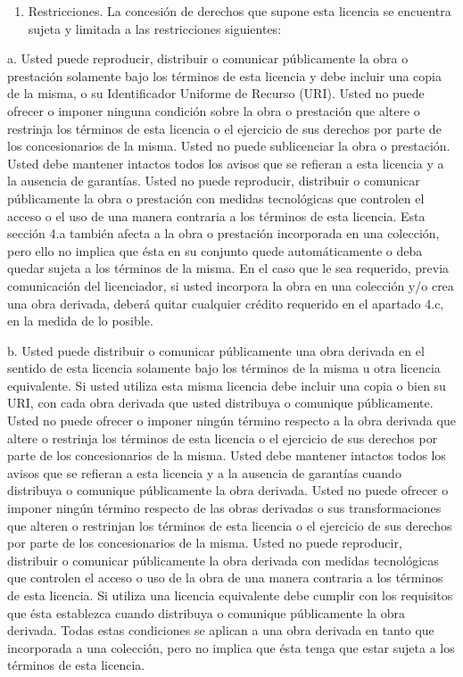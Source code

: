 \documentclass[11pt]{article}
\begin{document}
{{\begin{enumerate}
\item Restricciones. La concesión de derechos que supone esta licencia se encuentra sujeta y limitada a las restricciones siguientes:
\end{enumerate}
a. Usted puede reproducir, distribuir o comunicar públicamente la obra o prestación solamente bajo los términos de esta licencia y debe incluir una copia de la misma, o su Identificador Uniforme de Recurso (URI). Usted no puede ofrecer o imponer ninguna condición sobre la obra o prestación que altere o restrinja los términos de esta licencia o el ejercicio de sus derechos por parte de los concesionarios de la misma. Usted no puede sublicenciar la obra o prestación. Usted debe mantener intactos todos los avisos que se refieran a esta licencia y a la ausencia de garantías. Usted no puede reproducir, distribuir o comunicar públicamente la obra o prestación con medidas tecnológicas que controlen el acceso o el uso de una manera contraria a los términos de esta licencia. Esta sección 4.a también afecta a la obra o prestación incorporada en una colección, pero ello no implica que ésta en su conjunto quede automáticamente o deba quedar sujeta a los términos de la misma. En el caso que le sea requerido, previa comunicación del licenciador, si usted incorpora la obra en una colección y/o crea una obra derivada, deberá quitar cualquier crédito requerido en el apartado 4.c, en la medida de lo posible. 

b. Usted puede distribuir o comunicar públicamente una obra derivada en el sentido de esta licencia solamente bajo los términos de la misma u otra licencia equivalente. Si usted utiliza esta misma licencia debe incluir una copia o bien su URI, con cada obra derivada que usted distribuya o comunique públicamente. Usted no puede ofrecer o imponer ningún término respecto a la obra derivada que altere o restrinja los términos de esta licencia o el ejercicio de sus derechos por parte de los concesionarios de la misma. Usted debe mantener intactos todos los avisos que se refieran a esta licencia y a la ausencia de garantías cuando distribuya o comunique públicamente la obra derivada. Usted no puede ofrecer o imponer ningún término respecto de las obras derivadas o sus transformaciones que alteren o restrinjan los términos de esta licencia o el ejercicio de sus derechos por parte de los concesionarios de la misma. Usted no puede reproducir, distribuir o comunicar públicamente la obra derivada con medidas tecnológicas que controlen el acceso o uso de la obra de una manera contraria a los términos de esta licencia. Si utiliza una licencia equivalente debe cumplir con los requisitos que ésta establezca cuando distribuya o comunique públicamente la obra derivada. Todas estas condiciones se aplican a una obra derivada en tanto que incorporada a una colección, pero no implica que ésta tenga que estar sujeta a los términos de esta licencia. 

}}
\end{document}
